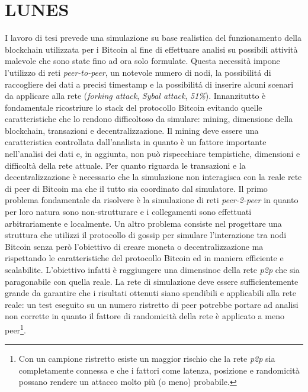 \chapter{LUNES}
I lavoro di tesi prevede una simulazione su base realistica del funzionamento della blockchain utilizzata per i Bitcoin al fine di effettuare analisi su possibili attività malevole che sono state fino ad ora solo formulate.\newlie
Questa necessità impone l'utilizzo di reti \textit{peer-to-peer}, un notevole numero di nodi, la possibilitá di raccogliere dei dati a precisi timestamp e la possibilitá di inserire alcuni scenari da applicare alla rete (\textit{forking attack}, \textit{Sybal attack}, \textit{51\%}).\newline
Innanzitutto è fondamentale ricostriure lo stack del protocollo Bitcoin evitando quelle caratteristiche che lo rendono difficoltoso da simulare: mining, dimensione della blockchain, transazioni e decentralizzazione.\newline
Il mining deve essere una caratteristica controllata dall'analista in quanto è un fattore importante nell'analisi dei dati e, in aggiunta, non può rispecchiare tempistiche, dimensioni e difficoltà della rete attuale.\newline
Per quanto riguarda le transazioni e la decentralizzazione è necessario che la simulazione non interagisca con la reale rete di peer di Bitcoin ma che il tutto sia coordinato dal simulatore.\newline
Il primo problema fondamentale da risolvere è la simulazione di reti \textit{peer-2-peer} in quanto per loro natura sono non-strutturare e i collegamenti sono effettuati arbitrariamente e localmente. Un altro problema consiste nel progettare una struttura che utilizzi il protocollo di gossip per simulare l'interazione tra nodi Bitcoin senza però l'obiettivo di creare moneta o decentralizzazione ma rispettando le caratteristiche del protocollo Bitcoin ed in maniera efficiente e scalabilite. L'obiettivo infatti è raggiungere una dimensinoe della rete \textit{p2p} che sia paragonabile con quella reale. La rete di simulazione deve essere sufficientemente grande da garantire che i risultati ottenuti siano spendibili e applicabili alla rete reale: un test eseguito su un numero ristretto di peer potrebbe portare ad analisi non corrette in quanto il fattore di randomicità della rete è applicato a meno peer\footnote{Con un campione ristretto esiste un maggior rischio che la rete \textit{p2p} sia completamente connessa e che i fattori come latenza, posizione e randomicità possano rendere un attacco molto più (o meno) probabile.}.


